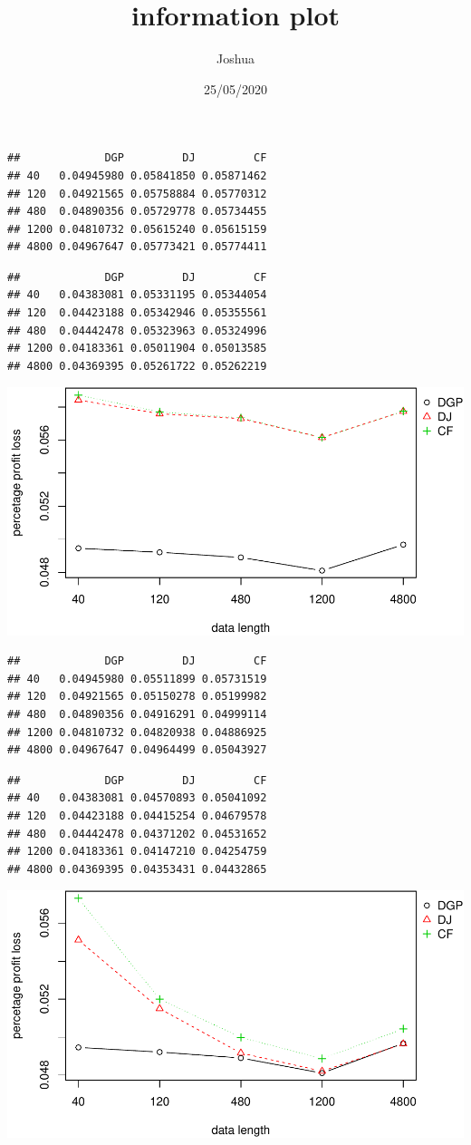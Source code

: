 \documentclass[
]{article}
\title{information plot}
\author{Joshua}
\date{25/05/2020}
\begin{document}
\maketitle

\begin{verbatim}
##             DGP         DJ         CF
## 40   0.04945980 0.05841850 0.05871462
## 120  0.04921565 0.05758884 0.05770312
## 480  0.04890356 0.05729778 0.05734455
## 1200 0.04810732 0.05615240 0.05615159
## 4800 0.04967647 0.05773421 0.05774411
\end{verbatim}

\begin{verbatim}
##             DGP         DJ         CF
## 40   0.04383081 0.05331195 0.05344054
## 120  0.04423188 0.05342946 0.05355561
## 480  0.04442478 0.05323963 0.05324996
## 1200 0.04183361 0.05011904 0.05013585
## 4800 0.04369395 0.05261722 0.05262219
\end{verbatim}

\includegraphics{information-plot_files/figure-latex/AR(1)-1.pdf}

\begin{verbatim}
##             DGP         DJ         CF
## 40   0.04945980 0.05511899 0.05731519
## 120  0.04921565 0.05150278 0.05199982
## 480  0.04890356 0.04916291 0.04999114
## 1200 0.04810732 0.04820938 0.04886925
## 4800 0.04967647 0.04964499 0.05043927
\end{verbatim}

\begin{verbatim}
##             DGP         DJ         CF
## 40   0.04383081 0.04570893 0.05041092
## 120  0.04423188 0.04415254 0.04679578
## 480  0.04442478 0.04371202 0.04531652
## 1200 0.04183361 0.04147210 0.04254759
## 4800 0.04369395 0.04353431 0.04432865
\end{verbatim}

\includegraphics{information-plot_files/figure-latex/SAR(3)(1)_4-1.pdf}
\end{document}
